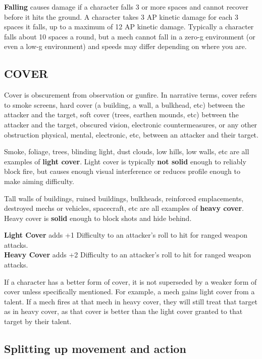 \textbf{Falling} causes damage if a character falls 3 or more spaces and cannot recover before it hits the ground. A character takes 3 AP kinetic damage for each 3 spaces it falls, up to a maximum of 12 AP kinetic damage. Typically a character falls about 10 spaces a round, but a mech cannot fall in a zero-g environment (or even a low-g environment) and speeds may differ depending on where you are.

\subsection{COVER}

Cover is obscurement from observation or gunfire. In narrative terms, cover refers to smoke screens, hard cover (a building, a wall, a bulkhead, etc) between the attacker and the target, soft cover (trees, earthen mounds, etc) between the attacker and the target, obscured vision, electronic countermeasures, or any other obstruction physical, mental, electronic, etc, between an attacker and their target.

Smoke, foliage, trees, blinding light, dust clouds, low hills, low walls, etc are all examples of \textbf{light cover}. Light cover is typically \textbf{not solid} enough to reliably block fire, but causes enough visual interference or reduces profile enough to make aiming difficulty.

Tall walls of buildings, ruined buildings, bulkheads, reinforced emplacements, destroyed mechs or vehicles, spacecraft, etc are all examples of \textbf{heavy cover}. Heavy cover is \textbf{solid} enough to block shots and hide behind.

\textbf{Light Cover} adds +1 Difficulty to an attacker’s roll to hit for ranged weapon attacks.\\
\textbf{Heavy Cover} adds +2 Difficulty to an attacker’s roll to hit for ranged weapon attacks.

If a character has a better form of cover, it is not superseded by a weaker form of cover unless specifically mentioned. For example, a mech gains light cover from a talent. If a mech fires at that mech in heavy cover, they will still treat that target as in heavy cover, as that cover is better than the light cover granted to that target by their talent.


\subsection{Splitting up movement and action}

